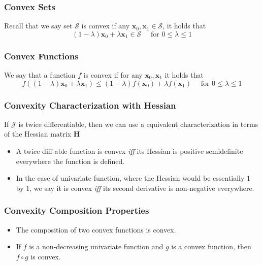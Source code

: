 \documentclass[11pt]{article}
\newcommand{\bx}{\mathbf{x}}
\begin{document}
\subsubsection{Convex Sets}
Recall that we say set $\mathcal{S}$ is convex if any $\bx_0, \bx_1 \in \mathcal{S}$, it holds that
\begin{equation}
    (1-\lambda) \mathbf{x}_{0}+\lambda \mathbf{x}_{1} \in \mathcal{S} \quad \text { for } 0 \leq \lambda \leq 1
\end{equation}
\subsubsection{Convex Functions}
We say that a function $f$ is convex if for any $\bx_0, \bx_1$ it holds that 
\begin{equation}
    f\left((1-\lambda) \mathbf{x}_{0}+\lambda \mathbf{x}_{1}\right) \leq(1-\lambda) f\left(\mathbf{x}_{0}\right)+\lambda f\left(\mathbf{x}_{1}\right)\quad \text { for } 0 \leq \lambda \leq 1
\end{equation}

\subsubsection{Convexity Characterization with Hessian}
If $\mathcal{J}$ is twice differentiable, then we can use a equivalent characterization in terms of the Hessian matrix $\mathbf{H}$
\begin{itemize}
    \item A twice diff-able function is convex \textit{iff} its Hessian is positive semidefinite everywhere the function is defined. 
    \item In the case of univariate function, where the Hessian would be essentially $1$ by $1$, we say it is convex \textit{iff} its second derivative is non-negative everywhere. 
\end{itemize}

\subsubsection{Convexity Composition Properties}
\begin{itemize}
    \item The composition of two convex functions is convex.
    \item If $f$ is a non-decreasing univariate function and $g$ is a convex function, then $f\circ g$ is convex. 
\end{itemize}
\end{document}
